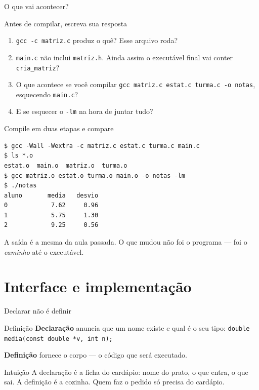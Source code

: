 \documentclass[aspectratio=169]{beamer}
\begin{document}
\begin{frame}{O que vai acontecer?}
  \begin{block}{Antes de compilar, escreva sua resposta}
    \begin{enumerate}
      \item \texttt{gcc -c matriz.c} produz o quê? Esse arquivo roda?
      \item \texttt{main.c} não inclui \texttt{matriz.h}. Ainda assim o
        executável final vai conter \texttt{cria\_matriz}?
      \item O que acontece se você compilar \texttt{gcc matriz.c estat.c
        turma.c -o notas}, esquecendo \texttt{main.c}?
      \item E se esquecer o \texttt{-lm} na hora de juntar tudo?
    \end{enumerate}
  \end{block}
\end{frame}

\begin{frame}[fragile]{Compile em duas etapas e compare}
\begin{lstlisting}[style=shellStyle]
$ gcc -Wall -Wextra -c matriz.c estat.c turma.c main.c
$ ls *.o
estat.o  main.o  matriz.o  turma.o
$ gcc matriz.o estat.o turma.o main.o -o notas -lm
$ ./notas
aluno       media   desvio
0            7.62     0.96
1            5.75     1.30
2            9.25     0.56
\end{lstlisting}
  \begin{block}{}
    \small A saída é a mesma da aula passada. O que mudou não foi o programa
    --- foi o \emph{caminho} até o executável.
  \end{block}
\end{frame}

\section{Interface e implementação}

\begin{frame}{Declarar não é definir}
  \begin{block}{Definição}
    \textbf{Declaração} anuncia que um nome existe e qual é o seu tipo:
    \texttt{double media(const double *v, int n);}

    \smallskip
    \textbf{Definição} fornece o corpo --- o código que será executado.
  \end{block}
  \begin{exampleblock}{Intuição}
    A declaração é a ficha do cardápio: nome do prato, o que entra, o que sai.
    A definição é a cozinha. Quem faz o pedido só precisa do cardápio.
  \end{exampleblock}
\end{frame}
\end{document}
